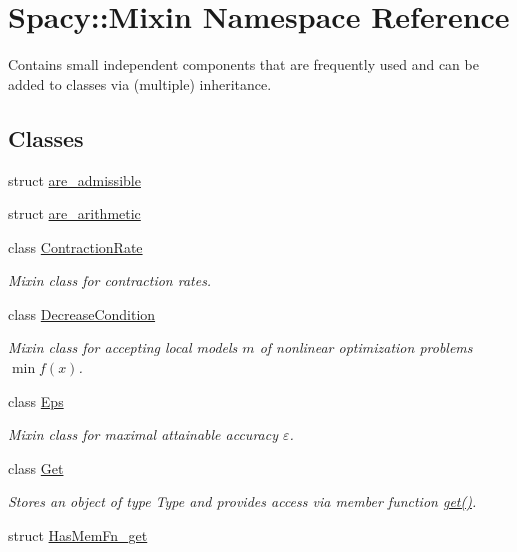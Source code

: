 \hypertarget{namespaceSpacy_1_1Mixin}{}\section{Spacy\+:\+:Mixin Namespace Reference}
\label{namespaceSpacy_1_1Mixin}


Contains small independent components that are frequently used and can be added to classes via (multiple) inheritance.  


\subsection*{Classes}
\begin{DoxyCompactItemize}
\item 
struct \hyperlink{structSpacy_1_1Mixin_1_1are__admissible}{are\+\_\+admissible}
\item 
struct \hyperlink{structSpacy_1_1Mixin_1_1are__arithmetic}{are\+\_\+arithmetic}
\item 
class \hyperlink{classSpacy_1_1Mixin_1_1ContractionRate}{Contraction\+Rate}
\begin{DoxyCompactList}\small\item\em Mixin class for contraction rates. \end{DoxyCompactList}\item 
class \hyperlink{classSpacy_1_1Mixin_1_1DecreaseCondition}{Decrease\+Condition}
\begin{DoxyCompactList}\small\item\em Mixin class for accepting local models $m$ of nonlinear optimization problems $\min f(x)$. \end{DoxyCompactList}\item 
class \hyperlink{classSpacy_1_1Mixin_1_1Eps}{Eps}
\begin{DoxyCompactList}\small\item\em Mixin class for maximal attainable accuracy $\varepsilon$. \end{DoxyCompactList}\item 
class \hyperlink{classSpacy_1_1Mixin_1_1Get}{Get}
\begin{DoxyCompactList}\small\item\em Stores an object of type Type and provides access via member function \hyperlink{classSpacy_1_1Mixin_1_1Get_aaa3afedcb9b9e943f81d1686b70417db}{get()}. \end{DoxyCompactList}\item 
struct \hyperlink{structSpacy_1_1Mixin_1_1HasMemFn__get}{Has\+Mem\+Fn\+\_\+get}

\end{DoxyCompactItemize}
